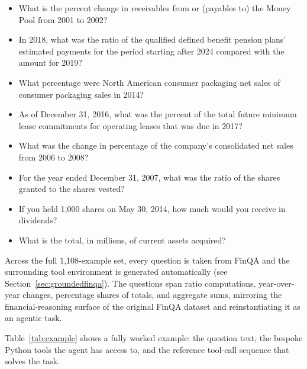 \documentclass[11pt]{article}
\begin{document}
\begin{itemize}
    \item What is the percent change in receivables from or (payables to) the Money Pool from 2001 to 2002?
    \item In 2018, what was the ratio of the qualified defined benefit pension plans' estimated payments for the period starting after 2024 compared with the amount for 2019?
    \item What percentage were North American consumer packaging net sales of consumer packaging sales in 2014?
    \item As of December 31, 2016, what was the percent of the total future minimum lease commitments for operating leases that was due in 2017?
    \item What was the change in percentage of the company's consolidated net sales from 2006 to 2008?
    \item For the year ended December 31, 2007, what was the ratio of the shares granted to the shares vested?
    \item If you held 1{,}000 shares on May 30, 2014, how much would you receive in dividends?
    \item What is the total, in millions, of current assets acquired?
\end{itemize}

Across the full 1{,}108-example set, every question is taken from FinQA and the surrounding tool environment is generated automatically (see Section~\ref{sec:groundedfinqa}). The questions span ratio computations, year-over-year changes, percentage shares of totals, and aggregate sums, mirroring the financial-reasoning surface of the original FinQA dataset and reinstantiating it as an agentic task.

Table~\ref{tab:example} shows a fully worked example: the question text, the bespoke Python tools the agent has access to, and the reference tool-call sequence that solves the task.
\end{document}
